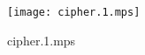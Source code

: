 \documentclass[letterpaper,10pt]{article}
\begin{document}
\begin{figure}
    \centering
    \texttt{[image: cipher.1.mps]}
    \caption{cipher.1.mps}
\end{figure}
\end{document}
